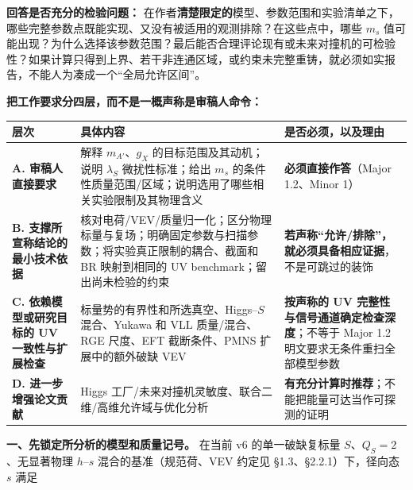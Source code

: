 \documentclass[
  chinese,
  UTF8]{ctexart}
\newcounter{none} %
\begin{document}
\textbf{回答是否充分的检验问题：}
在作者\textbf{清楚限定的}模型、参数范围和实验清单之下，哪些完整参数点既能实现、又没有被适用的观测排除？在这些点中，哪些
\(m_s\)
值可能出现？为什么选择该参数范围？最后能否合理评论现有或未来对撞机的可检验性？如果计算只得到上界、若干非连通区域，或约束未完整重铸，就必须如实报告，不能人为凑成一个``全局允许区间''。

\textbf{把工作要求分四层，而不是一概声称是审稿人命令：}

{\def\LTcaptype{none} %
\begin{longtable}[]{@{}
  >{\raggedright\arraybackslash}p{}
  >{\raggedright\arraybackslash}p{}
  >{\raggedright\arraybackslash}p{}@{}}
\toprule\noalign{}
\begin{minipage}[b]{\linewidth}\raggedright
层次
\end{minipage} & \begin{minipage}[b]{\linewidth}\raggedright
具体内容
\end{minipage} & \begin{minipage}[b]{\linewidth}\raggedright
是否必须，以及理由
\end{minipage} \\
\midrule\noalign{}
\endhead
\bottomrule\noalign{}
\endlastfoot
\textbf{A. 审稿人直接要求} & 解释 \(m_{A'}\)、\(g_X\)
的目标范围及其动机；说明 \(\lambda_S\) 微扰性标准；给出 \(m_s\)
的条件性质量范围/区域；说明选用了哪些相关实验限制及其物理含义 &
\textbf{必须直接作答}（Major 1.2、Minor 1） \\
\textbf{B. 支撑所宣称结论的最小技术依据} &
核对电荷/VEV/质量归一化；区分物理标量与复场；明确固定参数与扫描参数；将实验真正限制的耦合、截面和
BR 映射到相同的 UV benchmark；留出尚未检验的约束 &
\textbf{若声称``允许/排除''，就必须具备相应证据}，不是可跳过的装饰 \\
\textbf{C. 依赖模型或研究目标的 UV 一致性与扩展检查} &
标量势的有界性和所选真空、Higgs--\(S\) 混合、Yukawa 和 VLL
质量/混合、RGE 尺度、EFT 截断条件、PMNS 扩展中的额外破缺 VEV &
\textbf{按声称的 UV 完整性与信号通道确定检查深度}；不等于 Major 1.2
明文要求无条件重扫全部模型参数 \\
\textbf{D. 进一步增强论文贡献} & Higgs
工厂/未来对撞机灵敏度、联合二维/高维允许域与优化分析 &
\textbf{有充分计算时推荐}；不能把能量可达当作可探测的证明 \\
\end{longtable}
}

\textbf{一、先锁定所分析的模型和质量记号。} 在当前 v6 的单一破缺复标量
\(S\)、\(Q_S=2\)、无显著物理 \(h\)--\(s\) 混合的基准（规范荷、VEV 约定见
§1.3、§2.2.1）下，径向态 \(s\) 满足
\end{document}
